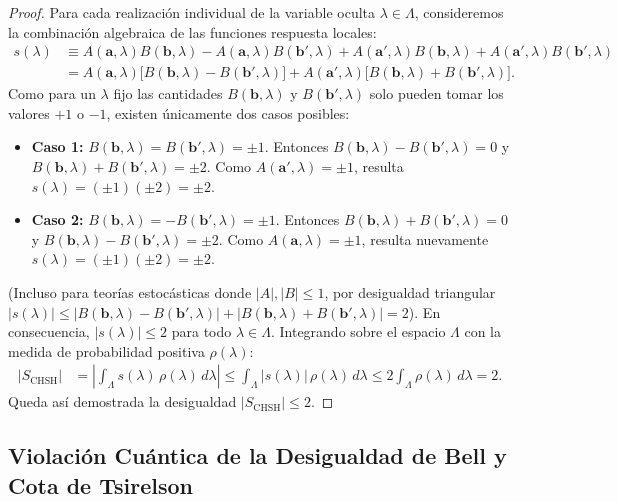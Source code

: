 \documentclass[11pt,a4paper,twoside]{report}
\theoremstyle{definition}
\theoremstyle{plain}
\theoremstyle{remark}
\begin{document}
\begin{proof}
Para cada realización individual de la variable oculta $\lambda \in \Lambda$, consideremos la combinación algebraica de las funciones respuesta locales:
\begin{align}
    s(\lambda) &\equiv A(\bm{a}, \lambda)B(\bm{b}, \lambda) - A(\bm{a}, \lambda)B(\bm{b}', \lambda) + A(\bm{a}', \lambda)B(\bm{b}, \lambda) + A(\bm{a}', \lambda)B(\bm{b}', \lambda) \nonumber \\
    &= A(\bm{a}, \lambda)\Big[ B(\bm{b}, \lambda) - B(\bm{b}', \lambda) \Big] + A(\bm{a}', \lambda)\Big[ B(\bm{b}, \lambda) + B(\bm{b}', \lambda) \Big].
\end{align}
Como para un $\lambda$ fijo las cantidades $B(\bm{b}, \lambda)$ y $B(\bm{b}', \lambda)$ solo pueden tomar los valores $+1$ o $-1$, existen únicamente dos casos posibles:
\begin{itemize}
    \item \textbf{Caso 1:} $B(\bm{b}, \lambda) = B(\bm{b}', \lambda) = \pm 1$. Entonces $B(\bm{b}, \lambda) - B(\bm{b}', \lambda) = 0$ y $B(\bm{b}, \lambda) + B(\bm{b}', \lambda) = \pm 2$. Como $A(\bm{a}', \lambda) = \pm 1$, resulta $s(\lambda) = (\pm 1)(\pm 2) = \pm 2$.
    \item \textbf{Caso 2:} $B(\bm{b}, \lambda) = -B(\bm{b}', \lambda) = \pm 1$. Entonces $B(\bm{b}, \lambda) + B(\bm{b}', \lambda) = 0$ y $B(\bm{b}, \lambda) - B(\bm{b}', \lambda) = \pm 2$. Como $A(\bm{a}, \lambda) = \pm 1$, resulta nuevamente $s(\lambda) = (\pm 1)(\pm 2) = \pm 2$.
\end{itemize}
(Incluso para teorías estocásticas donde $|A|, |B| \le 1$, por desigualdad triangular $|s(\lambda)| \le |B(\bm{b},\lambda) - B(\bm{b}',\lambda)| + |B(\bm{b},\lambda) + B(\bm{b}',\lambda)| = 2$). En consecuencia, $|s(\lambda)| \le 2$ para todo $\lambda \in \Lambda$. Integrando sobre el espacio $\Lambda$ con la medida de probabilidad positiva $\rho(\lambda)$:
\begin{align}
    |S_{\text{CHSH}}| &= \left| \int_{\Lambda} s(\lambda)\,\rho(\lambda)\,d\lambda \right| \le \int_{\Lambda} |s(\lambda)|\,\rho(\lambda)\,d\lambda \le 2 \int_{\Lambda} \rho(\lambda)\,d\lambda = 2.
\end{align}
Queda así demostrada la desigualdad $|S_{\text{CHSH}}| \le 2$.
\end{proof}

\subsection{Violación Cuántica de la Desigualdad de Bell y Cota de Tsirelson}
\end{document}

